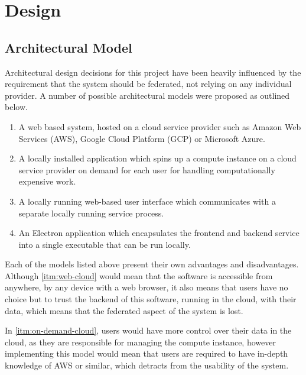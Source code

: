 \chapter{Design}


\section{Architectural Model}

Architectural design decisions for this project have been heavily influenced by the requirement that the system should be federated, not relying on any individual provider. A number of possible architectural models were proposed as outlined below.

\begin{enumerate}
  \item \label{itm:web-cloud} A web based system, hosted on a cloud service provider such as Amazon Web Services (AWS), Google Cloud Platform (GCP) or Microsoft Azure.
  \item \label{itm:on-demand-cloud} A locally installed application which spins up a compute instance on a cloud service provider on demand for each user for handling computationally expensive work.
  \item \label{itm:local-service} A locally running web-based user interface which communicates with a separate locally running service process.
  \item \label{itm:electron} An Electron application which encapsulates the frontend and backend service into a single executable that can be run locally.
\end{enumerate}

Each of the models listed above present their own advantages and disadvantages. Although \ref{itm:web-cloud} would mean that the software is accessible from anywhere, by any device with a web browser, it also means that users have no choice but to trust the backend of this software, running in the cloud, with their data, which means that the federated aspect of the system is lost.

In \ref{itm:on-demand-cloud}, users would have more control over their data in the cloud, as they are responsible for managing the compute instance, however implementing this model would mean that users are required to have in-depth knowledge of AWS or similar, which detracts from the usability of the system.


